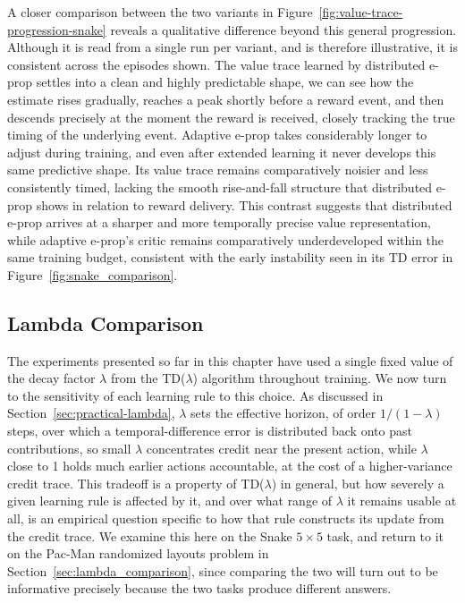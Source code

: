 A closer comparison between the two variants in Figure~\ref{fig:value-trace-progression-snake} reveals a
qualitative difference beyond this general progression. Although it is read from a single run
per variant, and is therefore illustrative, it is consistent across
the episodes shown. The value trace learned by distributed e-prop settles into a clean and
highly predictable shape, we can see how the estimate rises gradually, reaches a peak shortly before a reward
event, and then descends precisely at the moment the reward is received, closely tracking the
true timing of the underlying event. Adaptive e-prop takes considerably longer to adjust during
training, and even after extended learning it never develops this same predictive shape. Its
value trace remains comparatively noisier and less consistently timed, lacking the smooth
rise-and-fall structure that distributed e-prop shows in relation to reward delivery. This
contrast suggests that distributed e-prop arrives at a sharper and more temporally precise value
representation, while adaptive e-prop's critic remains comparatively underdeveloped within the
same training budget, consistent with the early instability seen in its TD error in Figure~\ref{fig:snake_comparison}.

\subsection{Lambda Comparison}
\label{sec:snake_lambda_comparison}

The experiments presented so far in this chapter have used a single fixed
value of the decay factor $\lambda$ from the TD($\lambda$) algorithm
throughout training. We now turn to the sensitivity of each learning rule
to this choice. As discussed in Section~\ref{sec:practical-lambda},
$\lambda$ sets the effective horizon, of order $1/(1-\lambda)$ steps, over
which a temporal-difference error is distributed back onto past
contributions, so small $\lambda$ concentrates credit near the present
action, while $\lambda$ close to 1 holds much earlier actions accountable,
at the cost of a higher-variance credit trace. This tradeoff is a property
of TD($\lambda$) in general, but how severely a given learning rule is
affected by it, and over what range of $\lambda$ it remains usable at all,
is an empirical question specific to how that rule constructs its update
from the credit trace. We examine this here on the Snake $5\times5$ task,
and return to it on the Pac-Man randomized layouts problem in
Section~\ref{sec:lambda_comparison}, since comparing the two will turn out
to be informative precisely because the two tasks produce different
answers.

